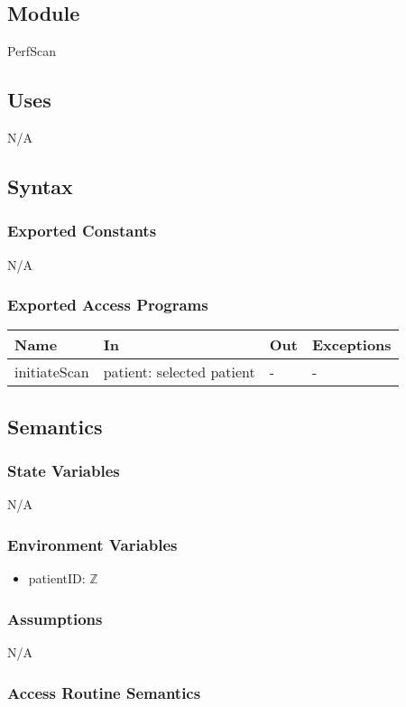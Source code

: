 \documentclass[12pt, titlepage]{article}
\begin{document}
\subsection{Module}
PerfScan
\subsection{Uses}
N/A
\subsection{Syntax}

\subsubsection{Exported Constants}
N/A
\subsubsection{Exported Access Programs}

\begin{center}
\begin{tabular}{p{3cm} p{4cm} p{2cm} p{5cm}}
\hline
\textbf{Name} & \textbf{In} & \textbf{Out} & \textbf{Exceptions} \\
\hline
initiateScan & patient: selected patient & - & - \\
\hline
\end{tabular}
\end{center}

\subsection{Semantics}

\subsubsection{State Variables}
N/A
\subsubsection{Environment Variables}
\begin{itemize}
    \item patientID: $\mathbb{Z}$
\end{itemize}
\subsubsection{Assumptions}
N/A
\subsubsection{Access Routine Semantics}
\end{document}
